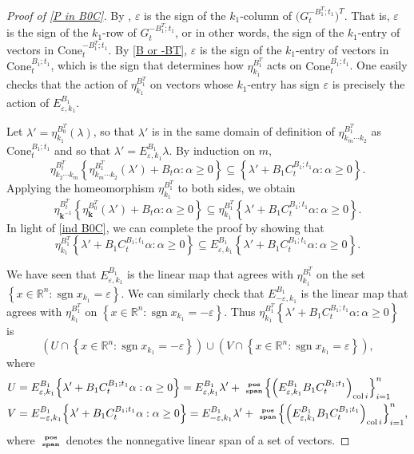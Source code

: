 \documentclass{amsart}
\theoremstyle{definition}
\theoremstyle{remark}
\numberwithin{equation}{section}
\newcommand{\reals}{\mathbb R}
\newcommand{\ep}{\varepsilon}
\newcommand{\col}{\operatorname{col}}
\newcommand{\sgn}{\operatorname{sgn}}
\newcommand{\posspan}{\!\tiny\begin{array}{c}\mathbf{pos}\\\mathbf{span}\end{array}\!\!}
\newcommand{\set}[1]{{\left\lbrace #1 \right\rbrace}}
\renewcommand{\th}{^\text{th}}
\newcommand{\0}{{\mathbf{0}}}
\newcommand{\Cone}{\mathrm{Cone}}
\newcommand{\kk}{\mathbf{k}}
\renewcommand{\th}{^\text{th}}
\begin{document}
\begin{proof}[Proof of \cref{P in B0C}]
By \cite[(1.13)]{NZ12}, $\ep$ is the sign of the $k_1$-column of $\bigl(G_t^{-B_1^T;t_1}\bigr)^T$.
That is, $\ep$ is the sign of the $k_1$-row of $G_t^{-B_1^T;t_1}$, or in other words, the sign of the $k_1$-entry of vectors in $\Cone_t^{-B^T_1;t_1}$.
By \cref{B or -BT}, $\ep$ is the sign of the $k_1$-entry of vectors in $\Cone_t^{B_1;t_1}$, which is the sign that determines how $\eta_{k_1}^{B_1^T}$ acts on $\Cone_t^{B_1;t_1}$.
One easily checks that the action of $\eta_{k_1}^{B_1^T}$ on vectors whose $k_1$-entry has sign $\ep$ is precisely the action of $E^{B_1}_{\ep,k_1}$.

Let $\lambda'=\eta_{k_1}^{B_0^T}(\lambda)$, so that $\lambda'$ is in the same domain of definition of $\eta_{k_m\cdots k_2}^{B_1^T}$ as $\Cone_t^{B_1;t_1}$ and so that $\lambda'=E^{B_1}_{\ep,k_1}\lambda$.
By induction on $m$, 
\[\eta_{k_2\cdots k_m}^{B_t^T}\set{\eta_{k_m\cdots k_2}^{B_1^T}(\lambda')+B_t\alpha:\alpha\ge0}\subseteq\set{\lambda'+B_1C_t^{B_1;t_1}\alpha:\alpha\ge0}.\]
Applying the homeomorphism $\eta_{k_1}^{B_1^T}$ to both sides, we obtain
\[\eta_{\kk^{-1}}^{B_t^T}\set{\eta_\kk^{B_0^T}(\lambda')+B_t\alpha:\alpha\ge0}\subseteq\eta_{k_1}^{B_1^T}\set{\lambda'+B_1C_t^{B_1;t_1}\alpha:\alpha\ge0}.\]
In light of \eqref{ind B0C}, we can complete the proof by showing that
\[\eta_{k_1}^{B_1^T}\set{\lambda'+B_1C_t^{B_1;t_1}\alpha:\alpha\ge0}\subseteq E^{B_1}_{\ep,k_1}\set{\lambda'+B_1C_t^{B_1;t_1}\alpha:\alpha\ge0}.\]

We have seen that $E^{B_1}_{\ep,k_1}$ is the linear map that agrees with $\eta_{k_1}^{B_1^T}$ on the set $\set{x\in\reals^n:\sgn x_{k_1}=\ep}$.
We can similarly check that $E^{B_1}_{-\ep,k_1}$ is the linear map that agrees with $\eta_{k_1}^{B_1^T}$ on $\set{x\in\reals^n:\sgn x_{k_1}=-\ep}$.
Thus $\eta_{k_1}^{B_1^T}\set{\lambda'+B_1C_t^{B_1;t_1}\alpha:\alpha\ge0}$ is
\[(U\cap\set{x\in\reals^n:\sgn x_{k_1}=-\ep})\cup(V\cap\set{x\in\reals^n:\sgn x_{k_1}=\ep}),\]
where 
{\small
\begin{align*}
U&=E^{B_1}_{\ep,k_1}\set{\lambda'+B_1C_t^{B_1;t_1}\alpha:\alpha\ge0}=E^{B_1}_{\ep,k_1}\lambda'+\posspan\set{\left(E^{B_1}_{\ep,k_1}B_1C_t^{B_1;t_1}\right)_{\col i}}_{i=1}^n\\
V&=E^{B_1}_{-\ep,k_1}\set{\lambda'+B_1C_t^{B_1;t_1}\alpha:\alpha\ge0}=E^{B_1}_{-\ep,k_1}\lambda'+\posspan\set{\left(E^{B_1}_{\ep,k_1}B_1C_t^{B_1;t_1}\right)_{\col i}}_{i=1}^n,
\end{align*}
}
where $\posspan$ denotes the nonnegative linear span of a set of vectors.


\end{proof}
\end{document}
